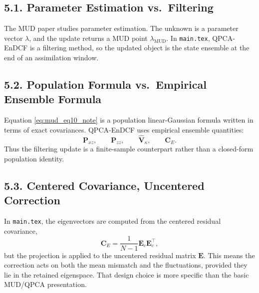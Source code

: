 \documentclass[11pt]{article}
\begin{document}
\subsection*{5.1. Parameter Estimation vs.\ Filtering}

The MUD paper studies parameter estimation. The unknown is a parameter vector $\lambda$, and the update returns a MUD point $\lambda_{\mathrm{MUD}}$. In \texttt{main.tex}, QPCA-EnDCF is a filtering method, so the updated object is the state ensemble at the end of an assimilation window.

\subsection*{5.2. Population Formula vs.\ Empirical Ensemble Formula}

Equation \eqref{eq:mud_eq10_note} is a population linear-Gaussian formula written in terms of exact covariances. QPCA-EnDCF uses empirical ensemble quantities:
\begin{equation}
\mathbf{P}_{xz},\qquad \mathbf{P}_{zz},\qquad \hat{\mathbf{V}}_\kappa,\qquad \mathbf{C}_E.
\end{equation}
Thus the filtering update is a finite-sample counterpart rather than a closed-form population identity.

\subsection*{5.3. Centered Covariance, Uncentered Correction}

In \texttt{main.tex}, the eigenvectors are computed from the centered residual covariance,
\begin{equation}
\mathbf{C}_E = \frac{1}{N-1}\mathbf{E}_c\mathbf{E}_c^\top,
\end{equation}
but the projection is applied to the uncentered residual matrix $\mathbf{E}$. This means the correction acts on both the mean mismatch and the fluctuations, provided they lie in the retained eigenspace. That design choice is more specific than the basic MUD/QPCA presentation.
\end{document}
